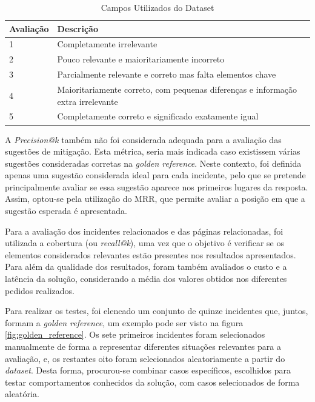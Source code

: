 	\begin{table}[H]
		\centering
		\begin{tabular}{|p{2cm}|p{11cm}|}
			\hline
			\textbf{Avaliação} & \textbf{Descrição} \\
			\hline
			1 & Completamente irrelevante \\
			\hline
			2 & Pouco relevante e maioritariamente incorreto \\
			\hline
			3 & Parcialmente relevante e correto mas falta elementos chave \\
			\hline
			4 & Maioritariamente correto, com pequenas diferenças e informação extra irrelevante \\
			\hline
			5 & Completamente correto e significado exatamente igual \\
			\hline
		\end{tabular}
		\caption[Campos Utilizados do Dataset]{Campos Utilizados do Dataset}
		\label{tab:rubrica_avaliacao}
	\end{table}
	
	A \textit{Precision@k} também não foi considerada adequada para a avaliação das sugestões de mitigação. Esta métrica, seria mais indicada caso existissem várias sugestões consideradas corretas na \textit{golden reference}. Neste contexto, foi definida apenas uma sugestão considerada ideal para cada incidente, pelo que se pretende principalmente avaliar se essa sugestão aparece nos primeiros lugares da resposta. Assim, optou-se pela utilização do \gls{MRR}, que permite avaliar a posição em que a sugestão esperada é apresentada.
	
	Para a avaliação dos incidentes relacionados e das páginas relacionadas, foi utilizada a cobertura (ou \textit{recall@k}), uma vez que o objetivo é verificar se os elementos considerados relevantes estão presentes nos resultados apresentados. Para além da qualidade dos resultados, foram também avaliados o custo e a latência da solução, considerando a média dos valores obtidos nos diferentes pedidos realizados.
	
	Para realizar os testes, foi elencado um conjunto de quinze incidentes que, juntos, formam a \textit{golden reference}, um exemplo pode ser visto na figura \ref{fig:golden_reference}. Os sete primeiros incidentes foram selecionados manualmente de forma a representar diferentes situações relevantes para a avaliação, e, os restantes oito foram selecionados aleatoriamente a partir do \textit{dataset}. Desta forma, procurou-se combinar casos específicos, escolhidos para testar comportamentos conhecidos da solução, com casos selecionados de forma aleatória.
	
